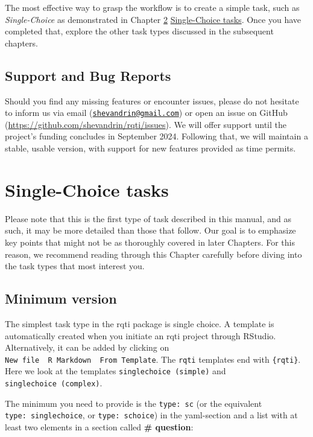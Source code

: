 \documentclass[twoside]{tufte-book}
\begin{document}
The most effective way to grasp the workflow is to create a simple task, such as \emph{Single-Choice} as demonstrated in Chapter \ref{single-choice-tasks} \href{Chapters/singlechoice.html}{Single-Choice tasks}. Once you have completed that, explore the other task types discussed in the subsequent chapters.

\section{Support and Bug Reports}\label{support-and-bug-reports}

Should you find any missing features or encounter issues, please do not hesitate to inform us via email (\href{mailto:shevandrin@gmail.com}{\nolinkurl{shevandrin@gmail.com}}) or open an issue on GitHub (\url{https://github.com/shevandrin/rqti/issues}). We will offer support until the project's funding concludes in September 2024. Following that, we will maintain a stable, usable version, with support for new features provided as time permits.

\chapter{Single-Choice tasks}\label{single-choice-tasks}

Please note that this is the first type of task described in this manual, and as such, it may be more detailed than those that follow. Our goal is to emphasize key points that might not be as thoroughly covered in later Chapters. For this reason, we recommend reading through this Chapter carefully before diving into the task types that most interest you.

\section{Minimum version}\label{minimum-version}

The simplest task type in the rqti package is single choice. A template is automatically created when you initiate an rqti project through RStudio. Alternatively, it can be added by clicking on \texttt{New\ file\ \textrightarrow{}\ R\ Markdown\ \textrightarrow{}\ From\ Template}. The \texttt{rqti} templates end with \texttt{\{rqti\}}. Here we look at the templates \texttt{singlechoice\ (simple)} and \texttt{singlechoice\ (complex)}.

The minimum you need to provide is the \texttt{type:\ sc} (or the equivalent \texttt{type:\ singlechoice}, or \texttt{type:\ schoice}) in the yaml-section and a list with at least two elements in a section called \textbf{\# question}:
\end{document}
